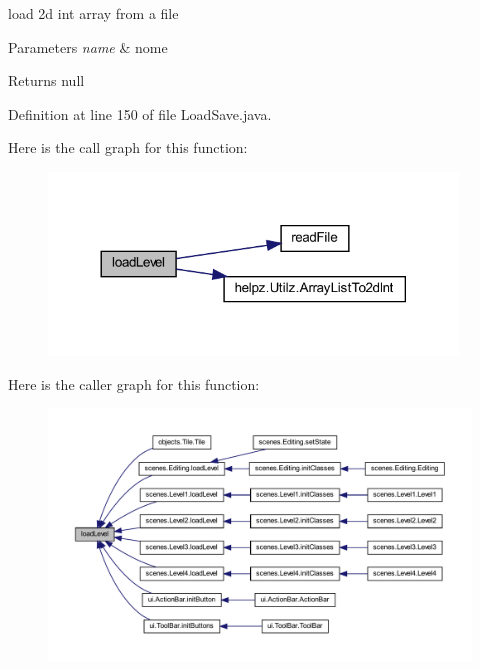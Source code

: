 load 2d int array from a file 


\begin{DoxyParams}{Parameters}
{\em name} & nome \\
\hline
\end{DoxyParams}
\begin{DoxyReturn}{Returns}
null 
\end{DoxyReturn}


Definition at line 150 of file Load\+Save.\+java.

Here is the call graph for this function\+:
\nopagebreak
\begin{figure}[H]
\begin{center}
\leavevmode
\includegraphics[width=308pt]{classhelpz_1_1_load_save_a9dbd50db72db31e6a9c5c423d4e48be3_cgraph}
\end{center}
\end{figure}
Here is the caller graph for this function\+:\nopagebreak
\begin{figure}[H]
\begin{center}
\leavevmode
\includegraphics[width=350pt]{classhelpz_1_1_load_save_a9dbd50db72db31e6a9c5c423d4e48be3_icgraph}
\end{center}
\end{figure}
\mbox{\label{classhelpz_1_1_load_save_a62d3bd4e3f361e1f99bd9d21a7d21b0d}} 

